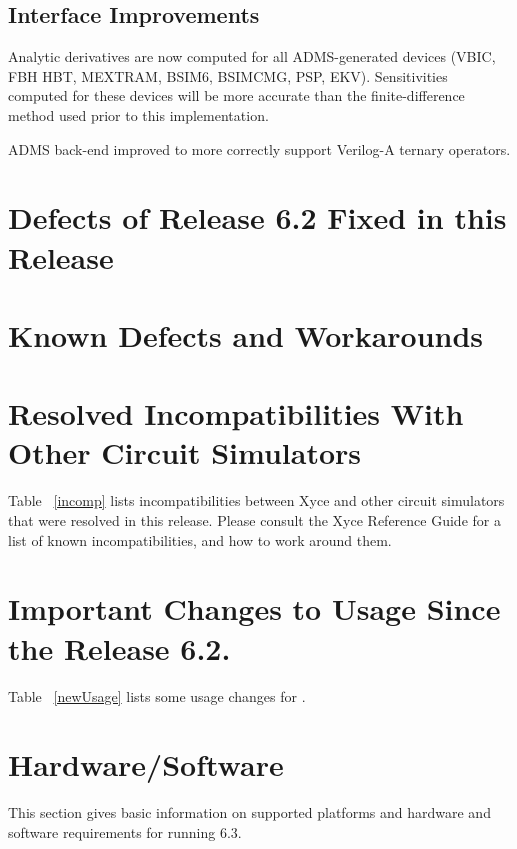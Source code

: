 \documentclass[11pt,report,strict]{SANDreport}
\begin{document}
\subsection{Interface Improvements}
\begin{XyceItemize}
\item   Analytic derivatives are now computed for all ADMS-generated devices (VBIC, FBH HBT, MEXTRAM, BSIM6, BSIMCMG, PSP, EKV).  Sensitivities computed for these devices will be more accurate than the finite-difference method used prior to this implementation.
\item   ADMS back-end improved to more correctly support Verilog-A ternary operators.
\end{XyceItemize}

\newpage
\section{Defects of Release 6.2 Fixed in this Release}


\newpage

\section{Known Defects and Workarounds}

\newpage

\section{Resolved Incompatibilities With Other Circuit Simulators}
Table ~\ref{incomp} lists incompatibilities between Xyce{} and other circuit
simulators that were resolved in this release.  Please consult the Xyce{} Reference
Guide for a list of known incompatibilities, and how to work around them.


\newpage
\section{Important Changes to \Xyce{} Usage Since the Release 6.2.}
Table ~\ref{newUsage} lists some usage changes for \Xyce{}.


\newpage
\section{Hardware/Software}
This section gives basic information on supported platforms and hardware
and software requirements for running \Xyce{} 6.3.
\end{document}
